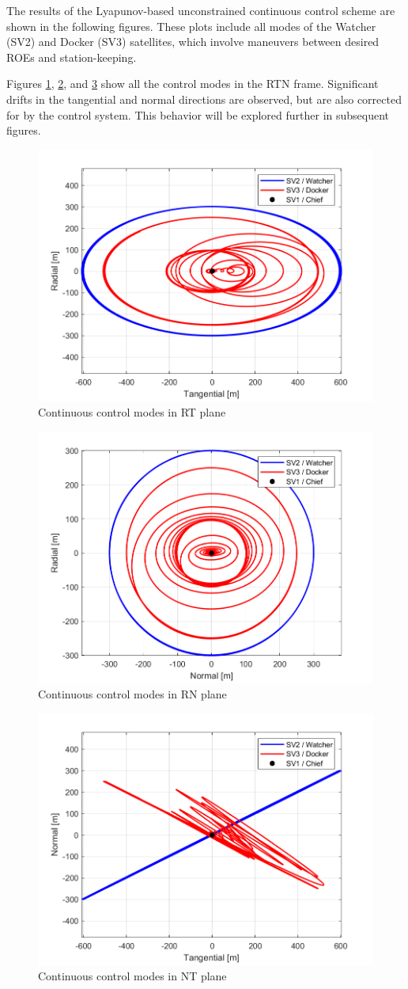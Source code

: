 The results of the Lyapunov-based unconstrained continuous control scheme are shown in the following figures. These plots include all modes of the Watcher (SV2) and Docker (SV3) satellites, which involve maneuvers between desired ROEs and station-keeping.

Figures \ref{fig:cont_control_RT}, \ref{fig:cont_control_RN}, and \ref{fig:cont_control_NT} show all the control modes in the RTN frame. Significant drifts in the tangential and normal directions are observed, but are also corrected for by the control system. This behavior will be explored further in subsequent figures.

\begin{figure}[H]
    \centering
    \includegraphics[width=0.5\linewidth]{sim/figures/PS6/RTN_3d_projections_all_maneuvers_cont.png_RT.png}
    \caption{Continuous control modes in RT plane}
    \label{fig:cont_control_RT}
\end{figure}
\begin{figure}[H]
    \centering
    \includegraphics[width=0.5\linewidth]{sim/figures/PS6/RTN_3d_projections_all_maneuvers_cont.png_RN.png}
    \caption{Continuous control modes in RN plane}
    \label{fig:cont_control_RN}
\end{figure}
\begin{figure}[H]
    \centering
    \includegraphics[width=0.5\linewidth]{sim/figures/PS6/RTN_3d_projections_all_maneuvers_cont.png_NT.png}
    \caption{Continuous control modes in NT plane}
    \label{fig:cont_control_NT}
\end{figure}

